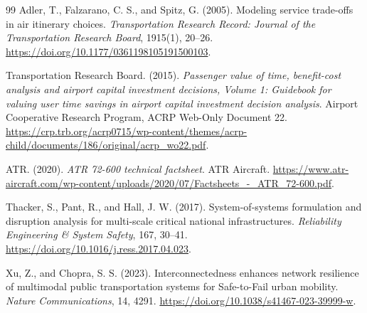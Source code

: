 \documentclass[11pt,a4paper]{article}
\begin{document}
\begin{thebibliography}{99}
Adler, T., Falzarano, C. S., and Spitz, G. (2005).
\newblock Modeling service trade-offs in air itinerary choices.
\newblock \emph{Transportation Research Record: Journal of the Transportation
Research Board}, 1915(1), 20--26.
\newblock \url{https://doi.org/10.1177/0361198105191500103}.

Transportation Research Board. (2015).
\newblock \emph{Passenger value of time, benefit-cost analysis and airport
capital investment decisions, Volume 1: Guidebook for valuing user time savings
in airport capital investment decision analysis}.
\newblock Airport Cooperative Research Program, ACRP Web-Only Document 22.
\newblock \url{https://crp.trb.org/acrp0715/wp-content/themes/acrp-child/documents/186/original/acrp_wo22.pdf}.

ATR. (2020).
\newblock \emph{ATR 72-600 technical factsheet}.
\newblock ATR Aircraft.
\newblock \url{https://www.atr-aircraft.com/wp-content/uploads/2020/07/Factsheets_-_ATR_72-600.pdf}.

Thacker, S., Pant, R., and Hall, J. W. (2017).
\newblock System-of-systems formulation and disruption analysis for
multi-scale critical national infrastructures.
\newblock \emph{Reliability Engineering \& System Safety}, 167, 30--41.
\newblock \url{https://doi.org/10.1016/j.ress.2017.04.023}.

Xu, Z., and Chopra, S. S. (2023).
\newblock Interconnectedness enhances network resilience of multimodal public
transportation systems for Safe-to-Fail urban mobility.
\newblock \emph{Nature Communications}, 14, 4291.
\newblock \url{https://doi.org/10.1038/s41467-023-39999-w}.

\end{thebibliography}
\end{document}
